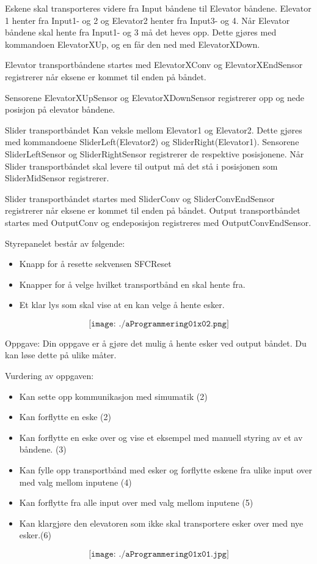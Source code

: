 \vskip 5pt 
Eskene skal transporteres videre fra Input båndene til Elevator båndene. Elevator 1 henter fra Input1- og 2 og Elevator2 henter fra Input3- og 4. Når Elevator båndene skal hente fra Input1- og 3 må det heves opp. Dette gjøres med kommandoen ElevatorXUp, og en får den ned med ElevatorXDown. 

\vskip 2.5pt 
Elevator transportbåndene startes med ElevatorXConv og ElevatorXEndSensor registrerer når eksene er kommet til enden på båndet. 

\vskip 5pt 
Sensorene ElevatorXUpSensor og ElevatorXDownSensor registrerer opp og nede posisjon på elevator båndene. 

\vskip 5pt 

Slider transportbåndet Kan veksle mellom Elevator1  og Elevator2. Dette gjøres med kommandoene SliderLeft(Elevator2) og SliderRight(Elevator1). Sensorene SliderLeftSensor og SliderRightSensor registrerer de respektive posisjonene. Når Slider transportbåndet skal levere til output må det stå i posisjonen som SliderMidSensor registrerer.  

\vskip 2.5pt 
Slider transportbåndet startes med SliderConv og SliderConvEndSensor registrerer når eksene er kommet til enden på båndet. 
\vskip 5pt 
Output transportbåndet startes med OutputConv og endeposisjon registreres med OutputConvEndSensor. 

\vskip 2.5pt 
Styrepanelet består av følgende:
\begin{itemize}[noitemsep]
	\item Knapp for å resette sekvensen SFCReset
	\item Knapper for å velge hvilket transportbånd en skal hente fra. 
	\item Et klar lys som skal vise at en kan velge å hente esker. 
\end{itemize}

$$\texttt{[image: ./aProgrammering01x02.png]}$$
\vskip 2.5pt 
  
\vskip 2.5pt 


Oppgave:
Din oppgave er å gjøre det mulig å hente esker ved output båndet. Du kan løse dette på ulike måter. 

Vurdering av oppgaven:
\begin{itemize}[noitemsep]
	\item Kan sette opp kommunikasjon med simumatik (2)
	\item Kan forflytte en eske (2)
	\item Kan forflytte en eske over og vise et eksempel med manuell styring av et av båndene. (3)
	\item Kan fylle opp transportbånd med esker og forflytte eskene fra ulike input over med valg mellom inputene (4)
	\item Kan forflytte fra alle input over med valg mellom inputene (5)
	\item Kan klargjøre den elevatoren som ikke skal transportere esker over med nye esker.(6)
\end{itemize}



\vfil\eject
$$\texttt{[image: ./aProgrammering01x01.jpg]}$$

